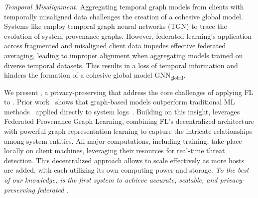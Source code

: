 \begin{enumerate}[itemsep=0.1em, parsep=0em, topsep=0em, leftmargin=*]
   {\it Temporal Misalignment.} Aggregating temporal graph models from clients with temporally misaligned data challenges the creation of a cohesive global model. Systems like \kairos \cite{cheng2023kairos} employ temporal graph neural networks (TGN) to trace the evolution of system provenance graphs. However, federated learning's application across fragmented and misaligned client data impedes effective federated averaging, leading to improper alignment when aggregating models trained on diverse temporal datasets. This results in a loss of temporal information and hinders the formation of a cohesive global model \( \text{GNN}_{\text{global}} \).
  
\end{enumerate}


\smallskip
{}
\smallskip

\noindent
We present \Sys, a privacy-preserving \pids that address the core challenges of applying FL to \pids. Prior work~\cite{wang2022threatrace} shows that graph-based models outperform traditional ML methods~\cite{chowdhary2020natural, goodfellow2020generative} applied directly to system logs~\cite{deeplog2017, xia2019loggan}. Building on this insight, \Sys leverages Federated Provenance Graph Learning, combining FL’s decentralized architecture with powerful graph representation learning to capture the intricate relationships among system entities. All major computations, including training, take place locally on client machines, leveraging their resources for real-time threat detection. This decentralized approach allows \Sys to scale effectively as more hosts are added, with each utilizing its own computing power and storage.  {\it To the best of our knowledge, \Sys is the first system to achieve accurate, scalable, and privacy-preserving federated \pids.}

